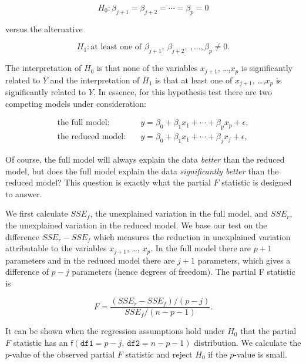 \documentclass[]{book}
\numberwithin{equation}{chapter}
\numberwithin{figure}{chapter}
\theoremstyle{plain}
\theoremstyle{definition}
\theoremstyle{remark}
\theoremstyle{definition}
\theoremstyle{definition}
\theoremstyle{remark}
\begin{document}
\begin{equation}
H_{0}:\beta_{j+1}=\beta_{j+2}=\cdots=\beta_{p}=0
\end{equation}

versus the alternative

\begin{equation}
H_{1}:\mbox{at least one of $\beta_{j+1},\ \beta_{j+2},\ ,\ldots,\beta_{p}\neq0$}.
\end{equation}

The interpretation of \(H_{0}\) is that none of the variables
\(x_{j+1}\), \ldots{},\(x_{p}\) is significantly related to \(Y\) and
the interpretation of \(H_{1}\) is that at least one of \(x_{j+1}\),
\ldots{},\(x_{p}\) is significantly related to \(Y\). In essence, for
this hypothesis test there are two competing models under consideration:

\begin{align}
\mbox{the full model:} & \quad y=\beta_{0}+\beta_{1}x_{1}+\cdots+\beta_{p}x_{p}+\epsilon,\\
\mbox{the reduced model:} & \quad y=\beta_{0}+\beta_{1}x_{1}+\cdots+\beta_{j}x_{j}+\epsilon,
\end{align}

Of course, the full model will always explain the data \emph{better}
than the reduced model, but does the full model explain the data
\emph{significantly better} than the reduced model? This question is
exactly what the partial \(F\) statistic is designed to answer.

We first calculate \(SSE_{f}\), the unexplained variation in the full
model, and \(SSE_{r}\), the unexplained variation in the reduced model.
We base our test on the difference \(SSE_{r}-SSE_{f}\) which measures
the reduction in unexplained variation attributable to the variables
\(x_{j+1}\), \ldots{}, \(x_{p}\). In the full model there are \(p+1\)
parameters and in the reduced model there are \(j+1\) parameters, which
gives a difference of \(p-j\) parameters (hence degrees of freedom). The
partial F statistic is

\begin{equation}
F=\frac{(SSE_{r}-SSE_{f})/(p-j)}{SSE_{f}/(n-p-1)}.
\end{equation}

It can be shown when the regression assumptions hold under \(H_{0}\)
that the partial \(F\) statistic has an
\(\mathsf{f}(\mathtt{df1}=p-j,\,\mathtt{df2}=n-p-1)\) distribution. We
calculate the \(p\)-value of the observed partial \(F\) statistic and
reject \(H_{0}\) if the \(p\)-value is small.
\end{document}
